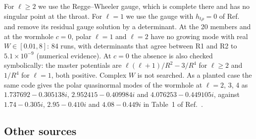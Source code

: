 \documentclass[11pt]{article}
\theoremstyle{plain}
\begin{document}
For $\ell\ge2$ we use the Regge--Wheeler gauge, which is complete there and has no singular point at the throat. For $\ell=1$
we use the gauge with $h_{t\rho}=0$ of Ref.~\cite{ABCKY23} and remove its residual gauge solution by a determinant. At the 20
members and at the wormhole $c=0$, polar $\ell=1$ and $\ell=2$ have no growing mode with real $W\in[0.01, 8]$: 84 runs, with
determinants that agree between R1 and R2 to $5.1\times10^{-9}$ (numerical evidence). At $c=0$ the absence is also
checked symbolically: the master potentials are $\ell(\ell+1)/R^2-3/R^4$ for $\ell\ge2$ and $1/R^4$ for $\ell=1$, both positive.
Complex $W$ is not searched. As a planted case the same code gives the polar quasinormal modes of the wormhole at $\ell=2$,
3, 4 as $1.737692-0.305138i$, $2.952415-0.409984i$ and $4.076253-0.449105i$, against $1.74-0.305i$, $2.95-0.410i$ and
$4.08-0.449i$ in Table~1 of Ref.~\cite{ABCKY23}.

\subsection{Other sources}\label{sec:sources}
\end{document}
